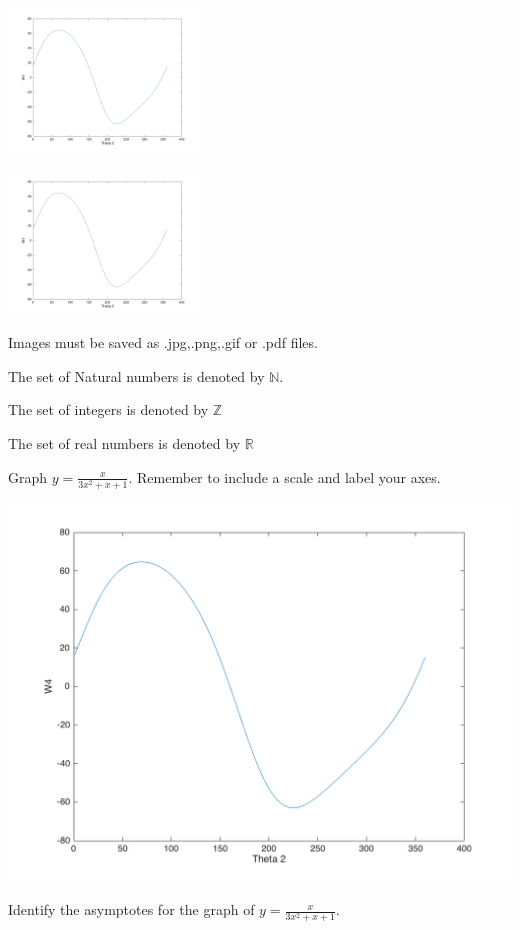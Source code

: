\documentclass[11pt]{article}
\def\eq1{y=\displaystyle{\frac{x}{3x^2+x+1}}}
\def\labelaxes{Remember to include a scale and label your axes}
\begin{document}
\begin{center}
\includegraphics[width=2in]{2vs24.png}
\end{center}


\begin{center}
\includegraphics[width=2in,angle=45]{2vs24.png}

Images must be saved as .jpg,.png,.gif or .pdf files.
\end{center}

The set of Natural numbers is denoted by $\mathbb{N}$.

The set of integers is denoted by $\mathbb{Z}$

The set of real numbers is denoted by $\mathbb{R}$

Graph $\eq1$. \labelaxes.

\includegraphics[width=6in]{2vs24.png}

Identify the asymptotes for the graph of $\eq1$.
\end{document}
